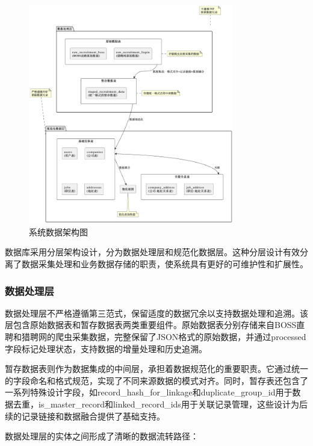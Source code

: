 \begin{figure}[htbp]
  \centering
  \includegraphics[width=0.8\textwidth]{figures/数据库概念设计.png}
  \caption{系统数据架构图}
  \label{fig:data_architecture}
\end{figure}


数据库采用分层架构设计，分为数据处理层和规范化数据层。这种分层设计有效分离了数据采集处理和业务数据存储的职责，使系统具有更好的可维护性和扩展性。

\subsubsection{数据处理层}
数据处理层不严格遵循第三范式，保留适度的数据冗余以支持数据处理和追溯。该层包含原始数据表和暂存数据表两类重要组件。原始数据表分别存储来自BOSS直聘和猎聘网的爬虫采集数据，完整保留了JSON格式的原始数据，并通过processed字段标记处理状态，支持数据的增量处理和历史追溯。

暂存数据表则作为数据集成的中间层，承担着数据规范化的重要职责。它通过统一的字段命名和格式规范，实现了不同来源数据的模式对齐。同时，暂存表还包含了一系列特殊设计字段，如record\_hash\_for\_linkage和duplicate\_group\_id用于数据去重，is\_master\_record和linked\_record\_ids用于关联记录管理，这些设计为后续的记录链接和数据融合提供了基础支持。

数据处理层的实体之间形成了清晰的数据流转路径：

